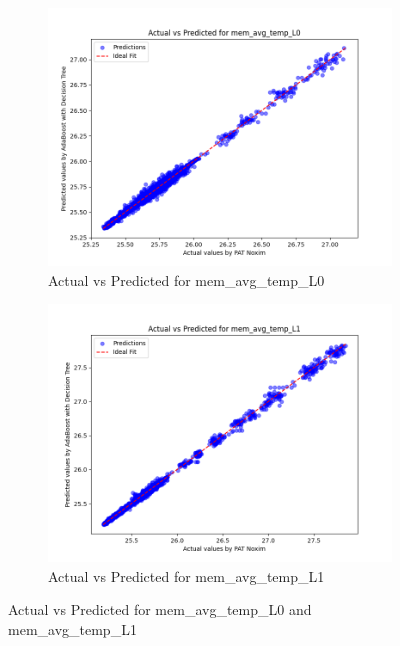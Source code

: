 \documentclass[conference]{IEEEtran}
\begin{document}
\begin{figure}[htbp]
    \begin{subfigure}{0.24\textwidth}
        \centering
        \includegraphics[width=\linewidth]{actual_vs_predicted_mem_avg_temp_L0.png}
        \caption{Actual vs Predicted for mem\_avg\_temp\_L0}
        \label{fig:actual_vs_predicted_mem_avg_temp_L0}
    \end{subfigure}
    \hfill
    \begin{subfigure}{0.24\textwidth}
        \centering
        \includegraphics[width=\linewidth]{actual_vs_predicted_mem_avg_temp_L1.png}
        \caption{Actual vs Predicted for mem\_avg\_temp\_L1}
        \label{fig:actual_vs_predicted_mem_avg_temp_L1}
    \end{subfigure}

    \caption{Actual vs Predicted for mem\_avg\_temp\_L0 and mem\_avg\_temp\_L1}
    \label{fig:side_by_side_graphs_mem_avg_temp}
\end{figure}
\end{document}
